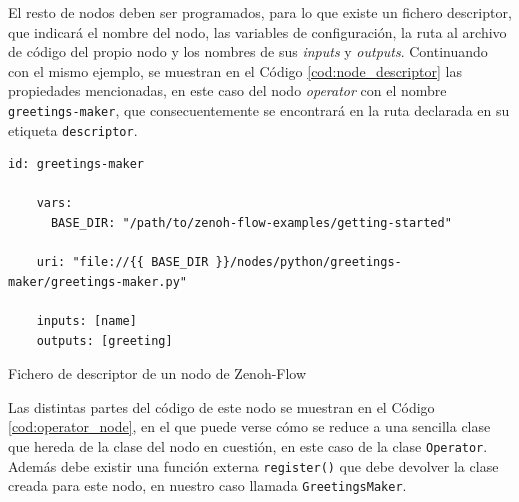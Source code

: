 El resto de nodos deben ser programados, para lo que existe un fichero
descriptor, que indicará el nombre del nodo, las variables de configuración, la
ruta al archivo de código del propio nodo y los nombres de sus \textit{inputs} y
\textit{outputs}.
Continuando con el mismo ejemplo, se muestran en el Código
\ref{cod:node_descriptor} las propiedades mencionadas, en este caso del nodo
\textit{operator} con el nombre \verb|greetings-maker|, que consecuentemente se
encontrará en la ruta declarada en su etiqueta \verb|descriptor|.
\\

\begin{code}[H]
  \begin{lstlisting}[style=yaml]
    id: greetings-maker

    vars:
      BASE_DIR: "/path/to/zenoh-flow-examples/getting-started"
    
    uri: "file://{{ BASE_DIR }}/nodes/python/greetings-maker/greetings-maker.py"
    
    inputs: [name]
    outputs: [greeting]
  \end{lstlisting}
\caption[Fichero de descriptor de un nodo de Zenoh-Flow]{Fichero de descriptor de un nodo de Zenoh-Flow}
\label{cod:node_descriptor}
\end{code}

Las distintas partes del código de este nodo se muestran en el Código
\ref{cod:operator_node}, en el que puede verse cómo se reduce a una sencilla
clase que hereda de la clase del nodo en cuestión, en este caso de la clase
\verb|Operator|. Además debe existir una función externa \verb|register()| que
debe devolver la clase creada para este nodo, en nuestro caso llamada
\verb|GreetingsMaker|.
\\

